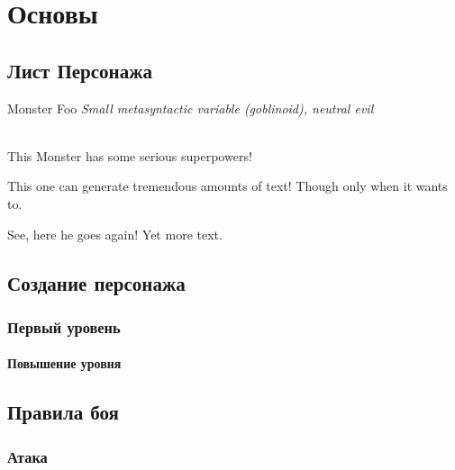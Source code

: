 \documentclass[10pt,twoside,twocolumn,openany]{book}
\begin{document}
\selectfont
\tableofcontents

\chapter{Основы}

\section{Лист Персонажа}
\begin{monsterbox}{Monster Foo}
	\textit{Small metasyntactic variable (goblinoid), neutral evil}\\
	\hline
	\basics[%
	armorclass = 12,
	hitpoints  = 16 (3d8 + 3),
	speed      = 50 ft
	]
	\hline
	\stats[
    STR = \stat{12}, 
    DEX = \stat{7}
	]
	\hline
	\details[
	languages = {Common Lisp, Erlang},
	]
	\hline \\[1mm]
	\begin{monsteraction}
		This Monster has some serious superpowers!
	\end{monsteraction}
	\begin{monsteraction}
		This one can generate tremendous amounts of text! Though only when it wants to.
	\end{monsteraction}

	\begin{monsteraction}
    See, here he goes again! Yet more text.
	\end{monsteraction}
\end{monsterbox}

\newpage
\section{Создание персонажа}
\lipsum[1]
\subsection{Первый уровень}
\lipsum[1]
\subsubsection{Повышение уровня}
\lipsum[1]

\newpage
\section{Правила боя}
\lipsum[1]
\subsection{Атака}
\lipsum[1]
\end{document}
